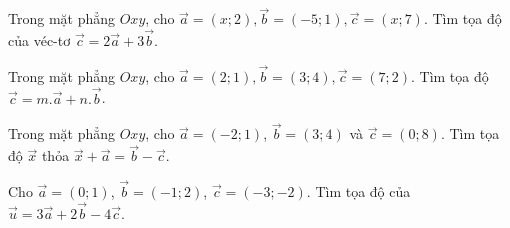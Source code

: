 \begin{bt}%
Trong mặt phẳng $Oxy$, cho $\vec{a}=\left(x; 2\right), \vec{b}=(- 5; 1), \vec{c}=\left(x; 7\right)$. Tìm tọa độ của véc-tơ $\vec{c}=2\vec{a} + 3\vec{b}$. 
\end{bt}

\begin{bt}%
	Trong mặt phẳng $Oxy$, cho $\vec{a}=(2; 1), \vec{b}=(3; 4), \vec{c}=(7; 2)$. Tìm tọa độ $\vec{c}=m. \vec{a} + n. \vec{b}$.
\end{bt}

\begin{bt}%
Trong mặt phẳng $Oxy$, cho $\vec{a}=(- 2; 1)$, $\vec{b}=\left(3; 4\right)$ và $\vec{c}=\left(0; 8\right)$. Tìm tọa độ $\vec{x}$ thỏa $\vec{x} + \vec{a}=\vec{b} - \vec{c}$.
\end{bt}


\begin{bt}%
	Cho $\vec{a}=(0;1)$, $\vec{b}=(- 1; 2)$, $\vec{c}=(- 3; - 2)$. Tìm tọa độ của $\vec{u}=3\vec{a} + 2\vec{b} - 4\vec{c}$. 
\end{bt}


